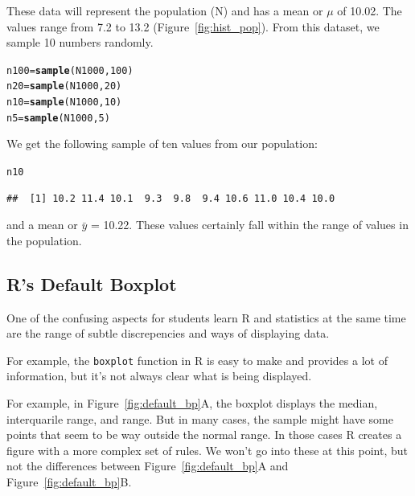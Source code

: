 \documentclass{tufte-handout}\usepackage[]{graphicx}\usepackage[]{color}
\makeatletter
\newcommand{\hlnum}[1]{\textcolor[rgb]{0.686,0.059,0.569}{#1}}%
\newcommand{\hlstd}[1]{\textcolor[rgb]{0.345,0.345,0.345}{#1}}%
\newcommand{\hlkwb}[1]{\textcolor[rgb]{0.69,0.353,0.396}{#1}}%
\newcommand{\hlkwd}[1]{\textcolor[rgb]{0.737,0.353,0.396}{\textbf{#1}}}%
\newenvironment{kframe}{%
 \def\at@end@of@kframe{}%
 \ifinner\ifhmode%
  \def\at@end@of@kframe{\end{minipage}}%
  \begin{minipage}{\columnwidth}%
 \fi\fi%
 \def\FrameCommand##1{\hskip\@totalleftmargin \hskip-\fboxsep
 \colorbox{shadecolor}{##1}\hskip-\fboxsep
     \hskip-\linewidth \hskip-\@totalleftmargin \hskip\columnwidth}%
 \MakeFramed {\advance\hsize-\width
   \@totalleftmargin\z@ \linewidth\hsize
   \@setminipage}}%
 {\par\unskip\endMakeFramed%
 \at@end@of@kframe}
\newenvironment{knitrout}{}{} %
\makeatother
\begin{document}
These data will represent the population (N) and has a mean or $\mu$ of 10.02. The values range from 7.2 to 13.2 (Figure~\ref{fig:hist_pop}). From this dataset, we sample 10 numbers randomly. 

\begin{knitrout}
\color{fgcolor}\begin{kframe}
\begin{alltt}
\hlstd{n100} \hlkwb{=} \hlkwd{sample}\hlstd{(N1000,} \hlnum{100}\hlstd{)}
\hlstd{n20} \hlkwb{=} \hlkwd{sample}\hlstd{(N1000,} \hlnum{20}\hlstd{)}
\hlstd{n10} \hlkwb{=} \hlkwd{sample}\hlstd{(N1000,} \hlnum{10}\hlstd{)}
\hlstd{n5} \hlkwb{=} \hlkwd{sample}\hlstd{(N1000,} \hlnum{5}\hlstd{)}
\end{alltt}
\end{kframe}
\end{knitrout}

We get the following sample of ten values from our population: 
\begin{knitrout}
\color{fgcolor}\begin{kframe}
\begin{alltt}
\hlstd{n10}
\end{alltt}
\begin{verbatim}
##  [1] 10.2 11.4 10.1  9.3  9.8  9.4 10.6 11.0 10.4 10.0
\end{verbatim}
\end{kframe}
\end{knitrout}
\noindent and a mean or $\bar{y}$ = 10.22. These values certainly fall within the range of values in the population.

\subsection{R's Default Boxplot}

One of the confusing aspects for students learn R and statistics at the same time are the range of subtle discrepencies and ways of displaying data. 

For example, the \texttt{boxplot} function in R is easy to make and provides a lot of information, but it's not always clear what is being displayed. 

For example, in Figure~\ref{fig:default_bp}A, the boxplot displays the median, interquarile range, and range. But in many cases, the sample might have some points that seem to be way outside the normal range. In those cases R creates a figure with a more complex set of rules. We won't go into these at this point, but not the differences between Figure~\ref{fig:default_bp}A and Figure~\ref{fig:default_bp}B. 
\end{document}
